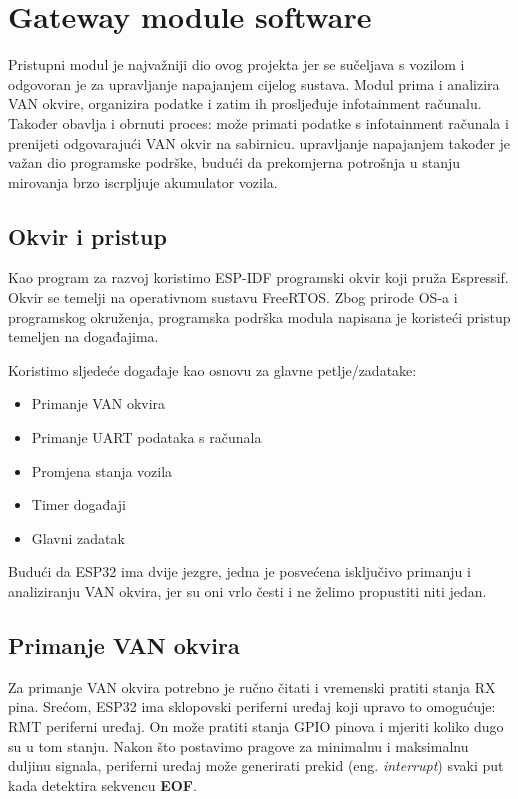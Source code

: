 \newpage
\section{Gateway module software}

Pristupni modul je najvažniji dio ovog projekta jer se sučeljava s vozilom i odgovoran je za upravljanje napajanjem cijelog sustava. 
Modul prima i analizira VAN okvire, organizira podatke i zatim ih prosljeđuje infotainment računalu. 
Također obavlja i obrnuti proces: može primati podatke s infotainment računala i prenijeti odgovarajući VAN okvir na sabirnicu. 
upravljanje napajanjem također je važan dio programske podrške, budući da prekomjerna potrošnja u stanju mirovanja brzo iscrpljuje akumulator vozila.

\subsection{Okvir i pristup}

Kao program za razvoj koristimo ESP-IDF programski okvir koji pruža Espressif. 
Okvir se temelji na operativnom sustavu FreeRTOS. Zbog prirode OS-a i programskog okruženja, programska podrška modula napisana je 
koristeći pristup temeljen na događajima.

\bigskip
\noindent
Koristimo sljedeće događaje kao osnovu za glavne petlje/zadatake:
\begin{itemize}
\item Primanje VAN okvira
\item Primanje UART podataka s računala
\item Promjena stanja vozila
\item Timer događaji
\item Glavni zadatak
\end{itemize}

\noindent
Budući da ESP32 ima dvije jezgre, jedna je posvećena isključivo primanju i analiziranju VAN okvira, jer su oni vrlo česti i ne želimo propustiti niti jedan.

\subsection{Primanje VAN okvira}

Za primanje VAN okvira potrebno je ručno čitati i vremenski pratiti stanja RX pina. 
Srećom, ESP32 ima sklopovski periferni uređaj koji upravo to omogućuje: RMT periferni uređaj. 
On može pratiti stanja GPIO pinova i mjeriti koliko dugo su u tom stanju. 
Nakon što postavimo pragove za minimalnu i maksimalnu duljinu signala, periferni uređaj može generirati prekid (eng. \textit{interrupt}) 
svaki put kada detektira sekvencu \textbf{EOF}.

